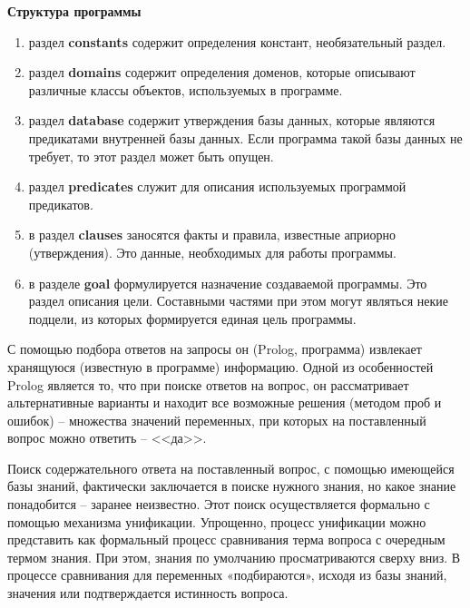 \documentclass[a4paper,14pt]{extreport} %
\begin{document}
\textbf{Структура программы }
\begin{enumerate}
\item раздел \textbf{constants} содержит определения констант, необязательный раздел.
\item раздел \textbf{domains} содержит определения доменов, которые описывают различные классы объектов, используемых в программе.
\item раздел \textbf{database} содержит утверждения базы данных, которые являются предикатами внутренней базы данных. Если программа такой базы данных не требует, то этот раздел может быть опущен.
\item раздел \textbf{predicates} служит для описания используемых программой предикатов.
\item в раздел \textbf{clauses} заносятся факты и правила, известные априорно (утверждения). Это данные, необходимых для работы программы.
\item в разделе \textbf{goal} формулируется назначение создаваемой программы. Это раздел описания цели. Составными частями при этом могут являться некие подцели, из которых формируется единая цель программы.
\end{enumerate}

С помощью подбора ответов на запросы он (Prolog, программа) извлекает хранящуюся (известную в программе) информацию. Одной из особенностей Prolog является то, что при поиске ответов на вопрос, он рассматривает альтернативные варианты и находит все возможные решения (методом проб и ошибок) -- множества значений переменных, при которых на поставленный вопрос можно ответить -- <<да>>.

Поиск содержательного ответа на поставленный вопрос, с помощью имеющейся базы знаний, фактически заключается в поиске нужного знания, но какое знание понадобится – заранее неизвестно. Этот поиск осуществляется формально с помощью механизма унификации. Упрощенно, процесс унификации можно представить как формальный процесс сравнивания терма вопроса с очередным термом знания. При этом, знания по умолчанию просматриваются сверху вниз. В процессе сравнивания для переменных «подбираются», исходя из базы знаний, значения или подтверждается истинность вопроса. 
\end{document}
